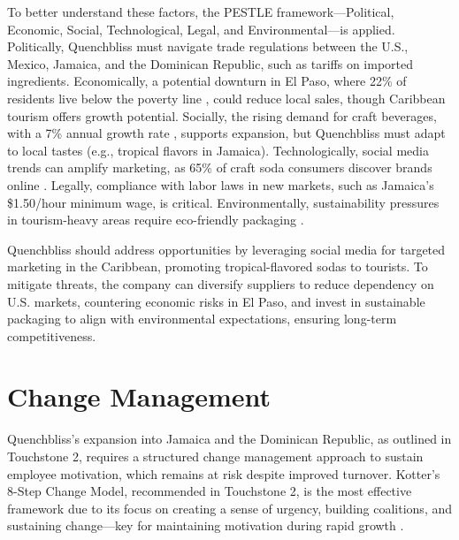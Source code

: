 \documentclass[12pt]{article}
\begin{document}
To better understand these factors, the PESTLE framework—Political, Economic, Social, Technological, Legal, and Environmental—is applied. Politically, Quenchbliss must navigate trade regulations between the U.S., Mexico, Jamaica, and the Dominican Republic, such as tariffs on imported ingredients. Economically, a potential downturn in El Paso, where 22\% of residents live below the poverty line \citep{elpaso2024}, could reduce local sales, though Caribbean tourism offers growth potential. Socially, the rising demand for craft beverages, with a 7\% annual growth rate \citep{mintel2024}, supports expansion, but Quenchbliss must adapt to local tastes (e.g., tropical flavors in Jamaica). Technologically, social media trends can amplify marketing, as 65\% of craft soda consumers discover brands online \citep{beverage2025}. Legally, compliance with labor laws in new markets, such as Jamaica’s \$1.50/hour minimum wage, is critical. Environmentally, sustainability pressures in tourism-heavy areas require eco-friendly packaging \citep{sophia_env}.

Quenchbliss should address opportunities by leveraging social media for targeted marketing in the Caribbean, promoting tropical-flavored sodas to tourists. To mitigate threats, the company can diversify suppliers to reduce dependency on U.S. markets, countering economic risks in El Paso, and invest in sustainable packaging to align with environmental expectations, ensuring long-term competitiveness.

\section{Change Management}
Quenchbliss’s expansion into Jamaica and the Dominican Republic, as outlined in Touchstone 2, requires a structured change management approach to sustain employee motivation, which remains at risk despite improved turnover. Kotter’s 8-Step Change Model, recommended in Touchstone 2, is the most effective framework due to its focus on creating a sense of urgency, building coalitions, and sustaining change—key for maintaining motivation during rapid growth \citep{sophia_change}.
\end{document}

